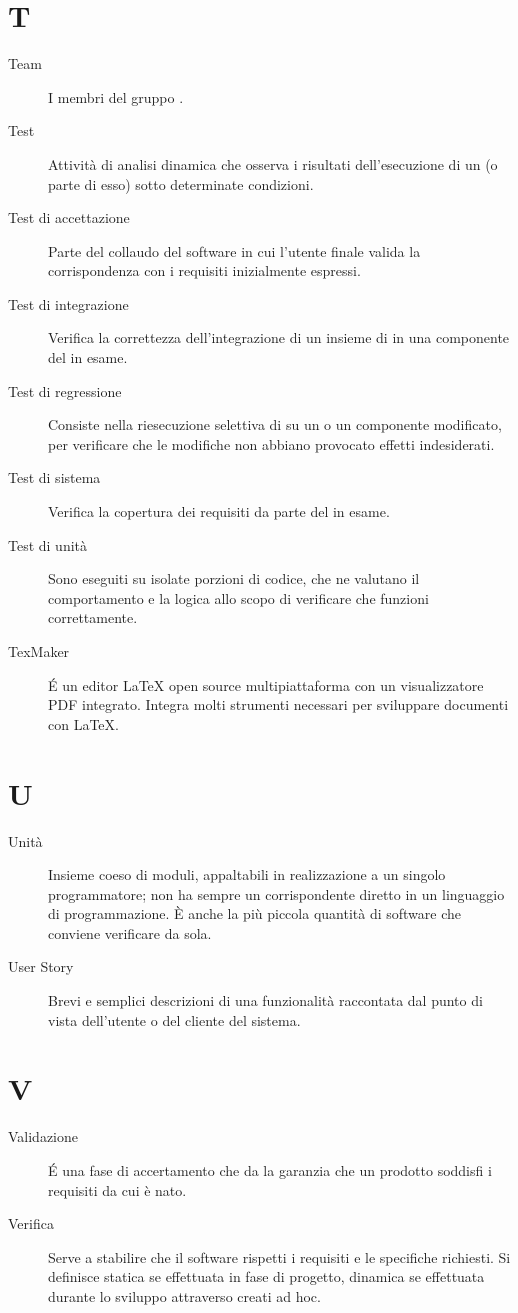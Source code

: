 \documentclass[a4paper, oneside]{article}
\begin{document}
\section{T}
\begin{description}
  \item[Team] I membri del gruppo \gruppo{}.
  \item[Test] Attività di analisi dinamica che osserva i risultati dell'esecuzione di un  (o parte di esso) sotto determinate condizioni.
  \item[Test di accettazione] Parte del collaudo del software in cui l'utente finale valida la corrispondenza con i requisiti inizialmente espressi.
  \item[Test di integrazione] Verifica la correttezza dell'integrazione di un insieme di  in una componente del  in esame.
  \item[Test di regressione] Consiste nella riesecuzione selettiva di  su un  o un componente modificato, per verificare che le modifiche non abbiano provocato effetti indesiderati.
  \item[Test di sistema] Verifica la copertura dei requisiti da parte del  in esame.
  \item[Test di unità] Sono  eseguiti su isolate porzioni di codice, che ne valutano il comportamento e la logica allo scopo di verificare che funzioni correttamente.
  \item[TexMaker] É un editor LaTeX open source multipiattaforma con un visualizzatore PDF integrato. Integra molti strumenti necessari per sviluppare documenti con LaTeX.
\end{description}
\newpage
\section{U}
\begin{description}
  \item[Unità] Insieme coeso di moduli, appaltabili in realizzazione a un singolo programmatore; non ha sempre un corrispondente diretto in un linguaggio di programmazione. È anche la più piccola quantità di software che conviene verificare da sola.
  \item[User Story] Brevi e semplici descrizioni di una funzionalità raccontata dal punto di vista dell’utente o del cliente del sistema.
\end{description}
\newpage
\section{V}
\begin{description}
  \item[Validazione] É una fase di accertamento che da la garanzia che un prodotto soddisfi i requisiti da cui è nato.
  \item[Verifica] Serve a stabilire che il software rispetti i requisiti e le specifiche richiesti. Si definisce statica se effettuata in fase di progetto, dinamica se effettuata durante lo sviluppo attraverso  creati ad hoc.
\end{description}
\newpage
\end{document}
